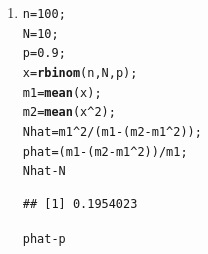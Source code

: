 \documentclass[12pt,a4paper]{article}\usepackage[]{graphicx}\usepackage[]{xcolor}
\makeatletter
\newcommand{\hlnum}[1]{\textcolor[rgb]{0.686,0.059,0.569}{#1}}%
\newcommand{\hlopt}[1]{\textcolor[rgb]{0,0,0}{#1}}%
\newcommand{\hldef}[1]{\textcolor[rgb]{0.345,0.345,0.345}{#1}}%
\newcommand{\hlkwb}[1]{\textcolor[rgb]{0.69,0.353,0.396}{#1}}%
\newcommand{\hlkwd}[1]{\textcolor[rgb]{0.737,0.353,0.396}{\textbf{#1}}}%
\newenvironment{kframe}{%
 \def\at@end@of@kframe{}%
 \ifinner\ifhmode%
  \def\at@end@of@kframe{\end{minipage}}%
  \begin{minipage}{\columnwidth}%
 \fi\fi%
 \def\FrameCommand##1{\hskip\@totalleftmargin \hskip-\fboxsep
 \colorbox{shadecolor}{##1}\hskip-\fboxsep
     \hskip-\linewidth \hskip-\@totalleftmargin \hskip\columnwidth}%
 \MakeFramed {\advance\hsize-\width
   \@totalleftmargin\z@ \linewidth\hsize
   \@setminipage}}%
 {\par\unskip\endMakeFramed%
 \at@end@of@kframe}
\newenvironment{knitrout}{}{} %
\makeatother
\begin{document}
\begin{enumerate}[label=\arabic*.]
\begin{enumerate}[label=(\alph*)]
\begin{knitrout}
\color{fgcolor}\begin{kframe}
\begin{alltt}
\hldef{n} \hlkwb{=} \hlnum{1000}
\hldef{N} \hlkwb{=} \hlnum{20}
\hldef{p} \hlkwb{=} \hlnum{0.4}
\hldef{x} \hlkwb{=} \hlkwd{rbinom}\hldef{(n,N,p)}
\hldef{m1} \hlkwb{=} \hlkwd{mean}\hldef{(x)}
\hldef{m2} \hlkwb{=} \hlkwd{mean}\hldef{(x}\hlopt{^}\hlnum{2}\hldef{)}
\hldef{Nhat} \hlkwb{=} \hldef{m1}\hlopt{^}\hlnum{2} \hlopt{/} \hldef{(m1} \hlopt{-} \hldef{(m2} \hlopt{-} \hldef{m1}\hlopt{^}\hlnum{2}\hldef{))}
\hldef{phat} \hlkwb{=} \hldef{(m1} \hlopt{-} \hldef{(m2} \hlopt{-} \hldef{m1}\hlopt{^}\hlnum{2}\hldef{))} \hlopt{/} \hldef{m1}
\hldef{Nhat} \hlopt{-} \hldef{N}
\end{alltt}
\begin{verbatim}
## [1] -1.488499
\end{verbatim}
\begin{alltt}
\hldef{phat} \hlopt{-} \hldef{p}
\end{alltt}
\begin{verbatim}
## [1] 0.03389243
\end{verbatim}
\end{kframe}
\end{knitrout}
        It does change, the error is much smaller now.
        \item 
\begin{knitrout}
\color{fgcolor}\begin{kframe}
\begin{alltt}
\hldef{n} \hlkwb{=} \hlnum{100}\hldef{;}
\hldef{N} \hlkwb{=} \hlnum{10}\hldef{;}
\hldef{p} \hlkwb{=} \hlnum{0.9}\hldef{;}
\hldef{x} \hlkwb{=} \hlkwd{rbinom}\hldef{(n,N,p);}
\hldef{m1} \hlkwb{=} \hlkwd{mean}\hldef{(x);}
\hldef{m2} \hlkwb{=} \hlkwd{mean}\hldef{(x}\hlopt{^}\hlnum{2}\hldef{);}
\hldef{Nhat} \hlkwb{=} \hldef{m1}\hlopt{^}\hlnum{2} \hlopt{/} \hldef{(m1} \hlopt{-} \hldef{(m2} \hlopt{-} \hldef{m1}\hlopt{^}\hlnum{2}\hldef{));}
\hldef{phat} \hlkwb{=} \hldef{(m1} \hlopt{-} \hldef{(m2} \hlopt{-} \hldef{m1}\hlopt{^}\hlnum{2}\hldef{))} \hlopt{/} \hldef{m1;}
\hldef{Nhat} \hlopt{-} \hldef{N}
\end{alltt}
\begin{verbatim}
## [1] 0.1954023
\end{verbatim}
\begin{alltt}
\hldef{phat} \hlopt{-} \hldef{p}
\end{alltt}

\end{kframe}
\end{knitrout}
\end{enumerate}
\end{enumerate}
\end{document}

